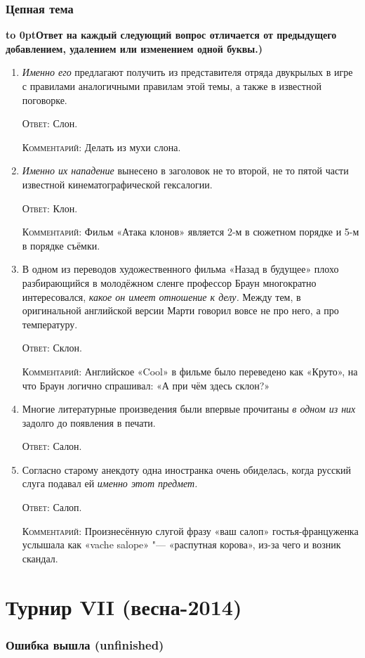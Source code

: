\documentclass[a4paper,10pt]{article}
\let\keyword\textsc
\newenvironment{topic}{\begin{enumerate}}{\end{enumerate}}
\newcommand{\question}[3]{\item[#1.] #2 \par \keyword{Ответ:} #3}
\newcommand{\commentary}[1]{\par \keyword{Комментарий:} #1}
\newcommand{\topiccommentary}[1]{\begin{adjustwidth}{0.9cm}{} \vspace{-0.3em}\textbf{\hbox to 0pt{\hss{(}}#1)} \end{adjustwidth}}
\begin{document}
\section{Цепная тема}
\topiccommentary{Ответ на каждый следующий вопрос отличается от предыдущего добавлением, удалением или изменением одной буквы.}

\begin{topic}
 \question{10}{\emph{Именно его} предлагают получить из представителя отряда двукрылых в игре с правилами аналогичными правилам этой темы, а также в известной поговорке.}{Слон.}\commentary{Делать из мухи слона.}
 \question{20}{\emph{Именно их нападение} вынесено в заголовок не то второй, не то пятой части известной кинематографической гексалогии.}{Клон.}\commentary{Фильм «Атака клонов» является 2-м в сюжетном порядке и 5-м в порядке съёмки.}
 \question{30}{В одном из переводов художественного фильма «Назад в будущее» плохо разбирающийся в молодёжном сленге профессор Браун многократно интересовался, \emph{какое он имеет отношение к делу.} Между тем, в оригинальной английской версии Марти говорил вовсе не про него, а про температуру.}{Склон.}\commentary{Английское «Cool» в фильме было переведено как «Круто», на что Браун логично спрашивал: «А при чём здесь склон?»}
 \question{40}{Многие литературные произведения были впервые прочитаны \emph{в одном из них} задолго до появления в печати.}{Салон.}
 \question{50}{Согласно старому анекдоту одна иностранка очень обиделась, когда русский слуга подавал ей \emph{именно этот предмет.}}{Салоп.}\commentary{Произнесённую слугой фразу «ваш салоп» гостья-француженка услышала как «vache salope» "--- «распутная корова», из-за чего и возник скандал.}
\end{topic}



\newpage
\part{Турнир VII (весна-2014)}

\section{Ошибка вышла (unfinished)}
\end{document}

